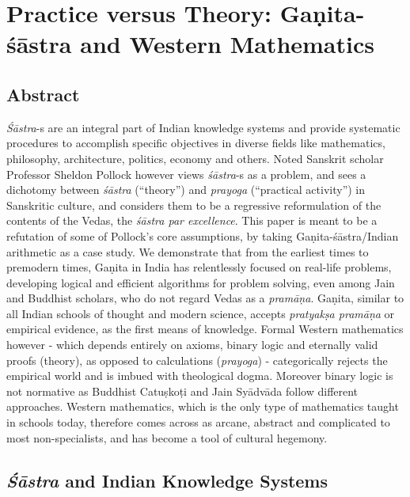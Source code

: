 \chapter{Practice versus Theory: Gaṇita-śāstra and Western Mathematics}\label{chapter5}


\section*{Abstract}

{\sl Śāstra}-s are an integral part of Indian knowledge systems and provide systematic procedures to accomplish specific objectives in diverse fields like mathematics, philosophy, architecture, politics, economy and others. Noted Sanskrit scholar Professor Sheldon Pollock however views {\sl śāstra}-s as a problem, and sees a dichotomy between {\sl śāstra} (``theory'') and {\sl prayoga} (``practical activity'') in Sanskritic culture, and considers them to be a regressive reformulation of the contents of the Vedas, the {\sl śāstra par excellence}. This paper is meant to be a refutation of some of Pollock's core assumptions, by taking Gaṇita-śāstra/Indian arithmetic as a case study. We demonstrate that from the earliest times to premodern times, Gaṇita in India has relentlessly focused on real-life problems, developing logical and efficient algorithms for problem solving, even among Jain and Buddhist scholars, who do not regard Vedas as a {\sl pramāṇa}. Gaṇita, similar to all Indian schools of thought and modern science, accepts {\sl pratyakṣa pramāṇa} or empirical evidence, as the first means of knowledge. Formal Western mathematics however - which depends entirely on axioms, binary logic and eternally valid proofs (theory), as opposed to calculations ({\sl prayoga}) -  categorically rejects the empirical world and is imbued with theological dogma. Moreover binary logic is not normative as Buddhist Catuṣkoṭi and Jain Syādvāda follow different approaches. Western mathematics, which is the only type of mathematics taught in schools today, therefore comes across as arcane, abstract and complicated to most non-specialists, and has become a tool of cultural hegemony. 

\section*{{\sl\bfseries Śāstra} and Indian Knowledge Systems}

